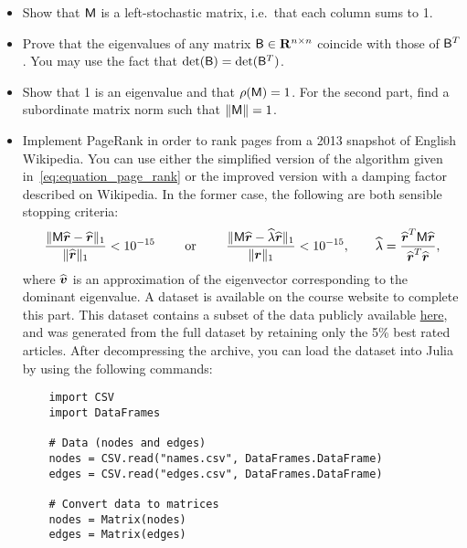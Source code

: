 \begin{exercise}
\begin{itemize}
        \item
            Show that $\mathsf M$ is a left-stochastic matrix,
            i.e.\ that each column sums to 1.

        \item
            Prove that the eigenvalues of any matrix $\mathsf B \in \mathbf R^{n \times n}$ coincide with those of $\mathsf B^T$.
            You may use the fact that $\det(\mathsf B) = \det(\mathsf B^T)$.

        \item
            Show that 1 is an eigenvalue and that $\rho(\mathsf M) = 1$.
            For the second part, find a subordinate matrix norm such that $\lVert\mathsf M\rVert= 1$.

        \item
            Implement PageRank  in order to rank pages from a 2013 snapshot of English Wikipedia.
            You can use either the simplified version of the algorithm given in~\eqref{eq:equation_page_rank} or the improved version with a damping factor described on Wikipedia.
            In the former case,
            the following are both sensible stopping criteria:
            \[
                \frac{\lVert\mathsf M \widehat{\mathbf{\boldsymbol{r}}} - \widehat{\mathbf{\boldsymbol{r}}}\rVert_1}{\lVert\widehat{\mathbf{\boldsymbol{r}}}\rVert_1} < 10^{-15}
                \qquad \text{ or } \qquad
                \frac{\lVert\mathsf M \widehat{\mathbf{\boldsymbol{r}}} - \widehat \lambda \widehat{\mathbf{\boldsymbol{r}}}\rVert_1}{\lVert\mathbf{\boldsymbol{r}}\rVert_1} < 10^{-15},
                \qquad \widehat \lambda = \frac{\widehat{\mathbf{\boldsymbol{r}}}^T \mathsf M \widehat{\mathbf{\boldsymbol{r}}}}{\widehat{\mathbf{\boldsymbol{r}}}^T \widehat{\mathbf{\boldsymbol{r}}}},
            \]
            where $\widehat{\mathbf{\boldsymbol{v}}}$ is an approximation of the eigenvector corresponding to the dominant eigenvalue.
            A dataset is available on the course website to complete this part.
            This dataset contains a subset of the data publicly available \hyperlink{https://snap.stanford.edu/data/enwiki-2013.html}{here},
            and was generated from the full dataset by retaining only the 5\% best rated articles.
            After decompressing the archive,
            you can load the dataset into Julia by using the following commands:

            \begin{verbatim}
    import CSV
    import DataFrames

    # Data (nodes and edges)
    nodes = CSV.read("names.csv", DataFrames.DataFrame)
    edges = CSV.read("edges.csv", DataFrames.DataFrame)

    # Convert data to matrices
    nodes = Matrix(nodes)
    edges = Matrix(edges)
            \end{verbatim}


\end{itemize}
\end{exercise}
